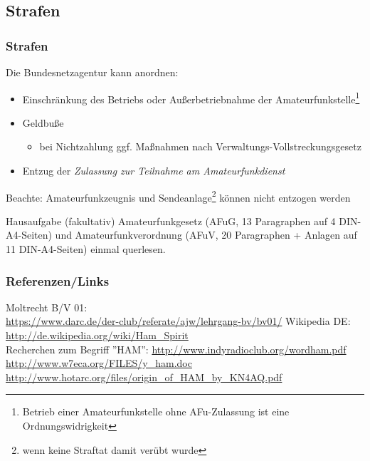 \subsection{Strafen}

\begin{frame}
  \frametitle{Strafen}

  Die Bundesnetzagentur kann anordnen:

  \begin{itemize}
    \item Einschränkung des Betriebs oder Außerbetriebnahme der
      Amateurfunkstelle\footnote{Betrieb einer Amateurfunkstelle ohne
      AFu-Zulassung ist eine Ordnungswidrigkeit}
    \item Geldbuße
      \begin{itemize}
        \item bei Nichtzahlung ggf. Maßnahmen nach Verwaltungs-Vollstreckungsgesetz
      \end{itemize}
    \item Entzug der \emph{Zulassung zur Teilnahme am Amateurfunkdienst}
  \end{itemize}

  \vspace{1em}

  Beachte: Amateurfunkzeugnis und Sendeanlage\footnote{wenn keine Straftat
  damit verübt wurde} können nicht entzogen werden

\end{frame}

\begin{frame}

  \begin{alertblock}{Hausaufgabe (fakultativ)}
    Amateurfunkgesetz (AFuG, 13 Paragraphen auf 4 DIN-A4-Seiten) und
    Amateurfunkverordnung (AFuV, 20 Paragraphen + Anlagen auf 11
    DIN-A4-Seiten) einmal querlesen.
  \end{alertblock}

\end{frame}

\renewcommand{\refname}{Referenzen}

\begin{frame}
  \frametitle{Referenzen/Links}
  \hypertarget{refs}{}
  \footnotesize

  \begin{thebibliography}{}
     Moltrecht B/V 01: \\
      \url{https://www.darc.de/der-club/referate/ajw/lehrgang-bv/bv01/}
        Wikipedia DE: \\
      \url{http://de.wikipedia.org/wiki/Ham_Spirit} \\
       Recherchen zum Begriff ''HAM'':
      \url{http://www.indyradioclub.org/wordham.pdf} \\
      \url{http://www.w7eca.org/FILES/y_ham.doc} \\
      \url{http://www.hotarc.org/files/origin_of_HAM_by_KN4AQ.pdf}
  \end{thebibliography}

\end{frame}


